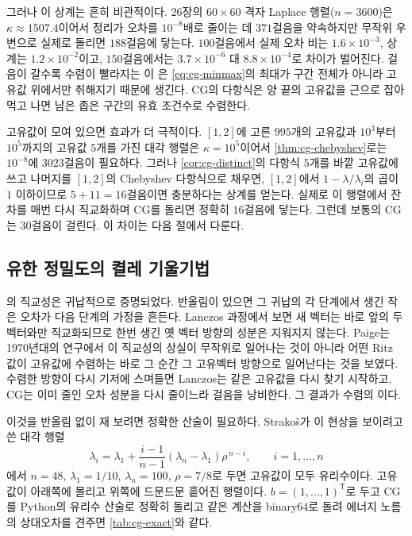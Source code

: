 그러나 이 상계는 흔히 비관적이다. 26장의 $60\times60$ 격자 Laplace 행렬($n=3600$)은 $\kappa\approx1507.4$이어서 정리가 오차를 $10^{-8}$배로 줄이는 데 $371$걸음을 약속하지만 무작위 우변으로 실제로 돌리면 $188$걸음에 닿는다. $100$걸음에서 실제 오차 비는 $1.6\times10^{-3}$, 상계는 $1.2\times10^{-2}$이고, $150$걸음에서는 $3.7\times10^{-6}$ 대 $8.8\times10^{-4}$로 차이가 벌어진다. 걸음이 갈수록 수렴이 빨라지는 이 은 \eqref{eq:cg-minmax}의 최대가 구간 전체가 아니라 고유값 위에서만 취해지기 때문에 생긴다. CG의 다항식은 양 끝의 고유값을 근으로 잡아 먹고 나면 남은 좁은 구간의 유효 조건수로 수렴한다.

고유값이 모여 있으면 효과가 더 극적이다. $[1,2]$에 고른 $995$개의 고유값과 $10^3$부터 $10^5$까지의 고유값 $5$개를 가진 대각 행렬은 $\kappa=10^5$이어서 \cref{thm:cg-chebyshev}로는 $10^{-8}$에 $3023$걸음이 필요하다. 그러나 \cref{cor:cg-distinct}의 다항식 $5$개를 바깥 고유값에 쓰고 나머지를 $[1,2]$의 Chebyshev 다항식으로 채우면, $[1,2]$에서 $1-\lambda/\lambda_i$의 곱이 $1$ 이하이므로 $5+11=16$걸음이면 충분하다는 상계를 얻는다. 실제로 이 행렬에서 잔차를 매번 다시 직교화하며 CG를 돌리면 정확히 $16$걸음에 닿는다. 그런데 보통의 CG는 $30$걸음이 걸린다. 이 차이는 다음 절에서 다룬다.

\subsection{유한 정밀도의 켤레 기울기법}
\label{sec:cg-finite}

의 직교성은 귀납적으로 증명되었다. 반올림이 있으면 그 귀납의 각 단계에서 생긴 작은 오차가 다음 단계의 가정을 흔든다. Lanczos 과정에서 보면 새 벡터는 바로 앞의 두 벡터와만 직교화되므로 한번 생긴 옛 벡터 방향의 성분은 지워지지 않는다. Paige는 1970년대의 연구에서 이 직교성의 상실이 무작위로 일어나는 것이 아니라 어떤 Ritz 값이 고유값에 수렴하는 바로 그 순간 그 고유벡터 방향으로 일어난다는 것을 보였다\cite{paige1976error,meurant2006}. 수렴한 방향이 다시 기저에 스며들면 Lanczos는 같은 고유값을 다시 찾기 시작하고, CG는 이미 줄인 오차 성분을 다시 줄이느라 걸음을 낭비한다. 그 결과가 수렴의 이다.

이것을 반올림 없이 재 보려면 정확한 산술이 필요하다. Strakoš가 이 현상을 보이려고 쓴 대각 행렬\cite{strakos1991}
\[
\lambda_i=\lambda_1+\frac{i-1}{n-1}(\lambda_n-\lambda_1)\rho^{\,n-i},\qquad i=1,\dots,n
\]
에서 $n=48$, $\lambda_1=1/10$, $\lambda_n=100$, $\rho=7/8$로 두면 고유값이 모두 유리수이다. 고유값이 아래쪽에 몰리고 위쪽에 드문드문 흩어진 행렬이다. $b=(1,\dots,1)^{\mathsf T}$로 두고 CG를 Python의 유리수 산술로 정확히 돌리고 같은 계산을 binary64로 돌려 에너지 노름의 상대오차를 견주면 \cref{tab:cg-exact}와 같다.

